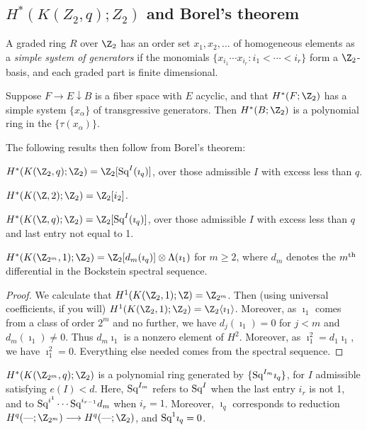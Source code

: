 \documentclass[11pt]{article}
\begin{document}
\subsection{\texorpdfstring{$H^*(K(Z_2,q);Z_2)$}{H*(K(Z/2,q);Z/2)} and Borel's theorem}
A graded ring $R$ over $\Z_2$ has an order set $x_1,x_2,\ldots$ of homogeneous elements as a \emph{simple system of generators} if the monomials $\{x_{i_1}\cdots x_{i_r}:i_1<\cdots<i_r\}$ form a $\Z_2$-basis, and each graded part is finite dimensional.
\begin{thm*}
Suppose $F\rightarrow E\downarrow B$ is a fiber space with $E$ acyclic, and that $H^*(F;\Z_2)$ has a simple system $\{x_\alpha\}$ of transgressive generators. Then $H^*(B;\Z_2)$ is a polynomial ring in the $\{\tau(x_\alpha)\}$.
\end{thm*}
The following results then follow from Borel's theorem:
\begin{thm*}
$H^*(K(\Z_2,q);\Z_2)=\Z_2[\Squ^I(\imath_q)]$, over those admissible $I$ with excess less than $q$.
\end{thm*}
\begin{prop*}
$H^*(K(\Z,2);\Z_2)=\Z_2[i_2]$.
\end{prop*}
\begin{thm*}$H^*(K(\Z,q);\Z_2)=\Z_2[\Squ^I(\imath_q)]$, over those admissible $I$ with excess less than $q$ and last entry not equal to 1.
\end{thm*}
\begin{prop*}$H^*(K(\Z_{2^m},1);\Z_2)=\Z_2[d_m(\imath_q)]\otimes \Lambda(\imath_1)$ for $m\geq2$, where $d_m$ denotes the $m^\textup{th}$ differential in the Bockstein spectral sequence.
\end{prop*}
\begin{proof}
We calculate that $H^1(K(\Z_2,1);\Z)=\Z_{2^m}$. Then (using universal coefficients, if you will) $H^1(K(\Z_2,1);\Z_2)=\Z_{2}\langle\imath_1\rangle$. Moreover, as $\imath_1$ comes from a class of order $2^m$ and no further, we have $d_j(\imath_1)=0$ for $j<m$ and $d_m(\imath_1)\neq0$. Thus $d_m\imath_1$ is a nonzero element of $H^2$. Moreover, as $\imath_1^2=d_1\imath_1$, we have $\imath_1^2=0$. Everything else needed comes from the spectral sequence.
\end{proof}
\begin{thm*}
$H^*(K(\Z_{2^m},q);\Z_2)$ is a polynomial ring generated by
$\{\textup{Sq}^{I_m}\imath_q\}$, for $I$ admissible satisfying $e(I)<d$. Here,
$\textup{Sq}^{I_m}$ refers to $\textup{Sq}^I$ when the last entry $i_r$ is not 1, and to
$\textup{Sq}^{i^1}\cdots \textup{Sq}^{i_{r-1}}d_m$ when $i_r=1$. Moreover, $\imath_q$ corresponds
to reduction $H^q(\DASH;\Z_{2^m})\to H^q(\DASH;\Z_{2})$, and $\textup{Sq}^1\imath_q=0$.
\end{thm*}
\end{document}
